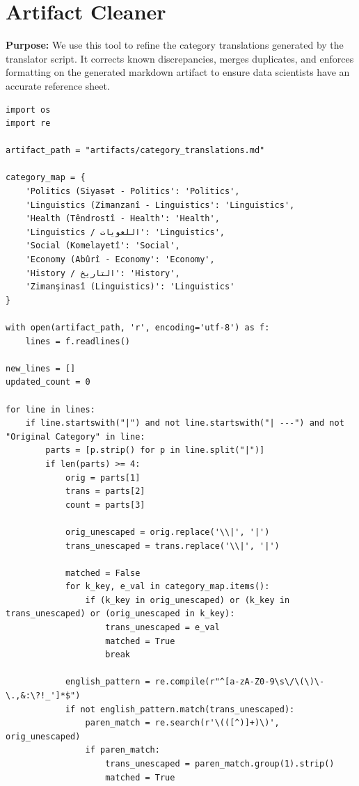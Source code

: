 \documentclass[11pt]{article}
\begin{document}
\section{Artifact Cleaner} \label{sec:artifactcleaner}
\textbf{Purpose:} We use this tool to refine the category translations generated by the translator script. It corrects known discrepancies, merges duplicates, and enforces formatting on the generated markdown artifact to ensure data scientists have an accurate reference sheet.

\begin{lstlisting}[style=pythoncode, caption={clean\_artifact.py}]
import os
import re

artifact_path = "artifacts/category_translations.md"

category_map = {
    'Politics (Siyasət - Politics': 'Politics',
    'Linguistics (Zimanzanî - Linguistics': 'Linguistics',
    'Health (Têndrostî - Health': 'Health',
    'Linguistics / اللغويات': 'Linguistics',
    'Social (Komelayetî': 'Social',
    'Economy (Abûrî - Economy': 'Economy',
    'History / التاریخ': 'History',
    'Zimanşinasî (Linguistics)': 'Linguistics'
}

with open(artifact_path, 'r', encoding='utf-8') as f:
    lines = f.readlines()

new_lines = []
updated_count = 0

for line in lines:
    if line.startswith("|") and not line.startswith("| ---") and not "Original Category" in line:
        parts = [p.strip() for p in line.split("|")]
        if len(parts) >= 4:
            orig = parts[1]
            trans = parts[2]
            count = parts[3]
            
            orig_unescaped = orig.replace('\\|', '|')
            trans_unescaped = trans.replace('\\|', '|')
            
            matched = False
            for k_key, e_val in category_map.items():
                if (k_key in orig_unescaped) or (k_key in trans_unescaped) or (orig_unescaped in k_key):
                    trans_unescaped = e_val
                    matched = True
                    break
            
            english_pattern = re.compile(r"^[a-zA-Z0-9\s\/\(\)\-\.,&:\?!_']*$")
            if not english_pattern.match(trans_unescaped):
                paren_match = re.search(r'\(([^)]+)\)', orig_unescaped)
                if paren_match:
                    trans_unescaped = paren_match.group(1).strip()
                    matched = True
            

\end{lstlisting}
\end{document}
